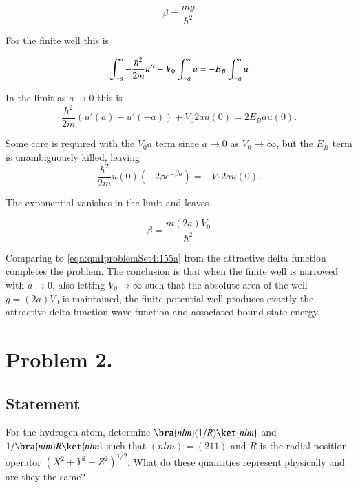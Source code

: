 \begin{equation}\label{eqn:qmIproblemSet4:155a}
\beta = \frac{mg}{\hbar^2}
\end{equation}

For the finite well this is

\begin{equation}\label{eqn:qmIproblemSet4:151}
\int_{-a}^a -\frac{\hbar^2}{2m} u'' - V_0 \int_{-a}^a u = -E_B \int_{-a}^a u \\
\end{equation}

In the limit as $a \rightarrow 0$ this is
\begin{equation}\label{eqn:qmIproblemSet4:152}
\frac{\hbar^2}{2m} (u'(a) - u'(-a)) + V_0 2 a u(0) = 2 E_B a u(0).
\end{equation}

Some care is required with the $V_0 a$ term since $a \rightarrow 0$ as $V_0 \rightarrow \infty$, but the $E_B$ term is unambiguously killed, leaving
\begin{equation}\label{eqn:qmIproblemSet4:153}
\frac{\hbar^2}{2m} u(0) (-2\beta e^{-\beta a}) = -V_0 2 a u(0).
\end{equation}

The exponential vanishes in the limit and leaves

\begin{equation}\label{eqn:qmIproblemSet4:155}
\beta = \frac{m (2 a) V_0}{\hbar^2}
\end{equation}

Comparing to \ref{eqn:qmIproblemSet4:155a} from the attractive delta function completes the problem.  The conclusion is that when the finite well is narrowed with $a \rightarrow 0$, also letting $V_0 \rightarrow \infty$ such that the absolute area of the well $g = (2 a) V_0$ is maintained, the finite potential well produces exactly the attractive delta function wave function and associated bound state energy.

\section{Problem 2.}
\subsection{Statement}

For the hydrogen atom, determine $\bra{nlm}(1/R)\ket{nlm}$ and $1/\bra{nlm}R\ket{nlm}$ such that $(nlm)=(211)$ and $R$ is the radial position operator $(X^2+Y^2+Z^2)^{1/2}$. What do these quantities represent physically and are they the same?

